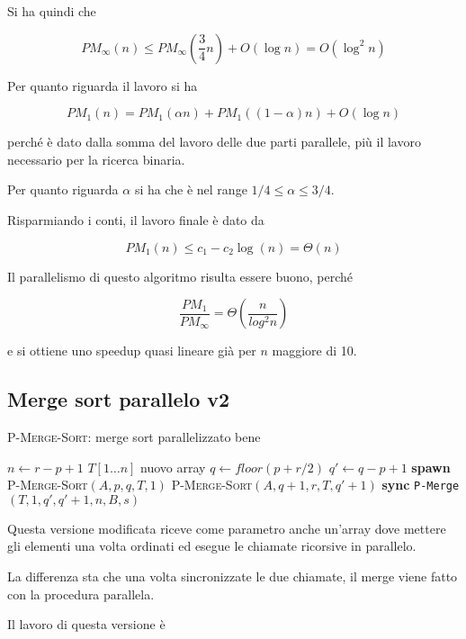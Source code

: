 Si ha quindi che

$$
PM_\infty(n) \leq PM_\infty(\frac{3}{4}n) + O(\log n) = O(\log^2 n)
$$

Per quanto riguarda il lavoro si ha

$$
PM_1(n) = PM_1(\alpha n) + PM_1( (1-\alpha) n) + O(\log n)
$$

perché è dato dalla somma del lavoro delle due parti parallele, più il lavoro necessario per la ricerca binaria.

Per quanto riguarda $\alpha$ si ha che è nel range $1/4 \leq \alpha \leq 3/4$.

Risparmiando i conti, il lavoro finale è dato da

$$
PM_1(n) \leq c_1 - c_2 \log (n) = \Theta (n)
$$

Il parallelismo di questo algoritmo risulta essere buono, perché

$$
\frac{PM_1}{PM_\infty} = \Theta (\frac{n}{log^2 n})
$$

e si ottiene uno speedup quasi lineare già per $n$ maggiore di 10.

\subsection{Merge sort parallelo v2}\label{merge-sort-parallelo-v2}

\begin{breakablealgorithm}
	\caption{\textsc{P-Merge-Sort}: merge sort parallelizzato bene}
	\begin{algorithmic}[1]
\State $n \gets r - p +1$
    \State \Return
\EndIf 
{}
    \State $T[1 \ldots n] $ nuovo array
    \State $q \gets floor(p+r/2)$
    \State $q' \gets q - p +1$
    \State \textbf{spawn } \textsc{P-Merge-Sort}$(A,p,q, T, 1)$
    \State \textsc{P-Merge-Sort}$(A,q+1,r, T, q'+1)$
    \State \textbf{sync}
    \State \texttt{P-Merge}$(T, 1, q', q'+1, n, B, s)$
\EndIf
\EndFunction
\end{algorithmic}
\end{breakablealgorithm}

Questa versione modificata riceve come parametro anche un'array dove mettere gli elementi una volta ordinati ed esegue le chiamate ricorsive in parallelo.

La differenza sta che una volta sincronizzate le due chiamate, il merge viene fatto con la procedura parallela.

Il lavoro di questa versione è

